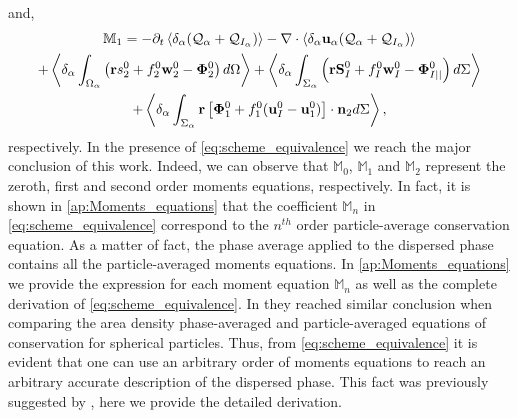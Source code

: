 and,
\begin{multline*}
    \mathbb{M}_1 =
    - \partial_t \left<\delta_\alpha (\mathcal{Q}_\alpha+\mathcal{Q}_{I_\alpha})\right>
    - \mathbf{\nabla}\cdot \left<\delta_\alpha\textbf{u}_\alpha(\mathcal{Q}_\alpha+\mathcal{Q}_{I_\alpha})\right>
    \\ + \left<\delta_\alpha\int_{\Omega_\alpha} \left(
        \textbf{r} s_2^0         
        + f_2^0  \textbf{w}_2^0 
        - \mathbf{\Phi}_2^0
    \right) d\Omega\right>
    + \left<\delta_\alpha\int_{\Sigma_\alpha} \left(
        \textbf{r}\textbf{S}_I^0
        + f_I^0 \textbf{w}_I^0
        - \mathbf{\Phi}_{I||}^0
    \right) d\Sigma\right>\\
    + \left<\delta_\alpha\int_{\Sigma_\alpha} \textbf{r} \left[
        \mathbf{\Phi}_1^0
        + f_1^0 (\textbf{u}_I^0-\textbf{u}_1^0)
    \right]\cdot \textbf{n}_2  d\Sigma\right>,
\end{multline*}
respectively. 
In the presence of \ref{eq:scheme_equivalence} we reach the major conclusion of this work. 
Indeed, we can observe that $\mathbb{M}_0$, $\mathbb{M}_1$ and $\mathbb{M}_2$ represent the zeroth, first and second order moments equations, respectively. 
In fact, it is shown in \ref{ap:Moments_equations} that the coefficient $\mathbb{M}_n$ in \ref{eq:scheme_equivalence} correspond to the $n^{th}$ order particle-average conservation equation. 
As a matter of fact, the phase average applied to the dispersed phase contains all the particle-averaged moments equations.
In \ref{ap:Moments_equations} we provide the expression for each moment equation $\mathbb{M}_n$ as well as the complete derivation of \ref{eq:scheme_equivalence}. 
In \cite{lhuillier2000bilan} they reached similar conclusion when comparing the area density phase-averaged and particle-averaged equations of conservation for spherical particles. 
Thus, from \ref{eq:scheme_equivalence} it is evident that one can use an arbitrary order of moments equations to reach an arbitrary accurate description of the dispersed phase.
This fact was previously suggested by \citet{zhang1997momentum}, here we provide the detailed derivation.  

